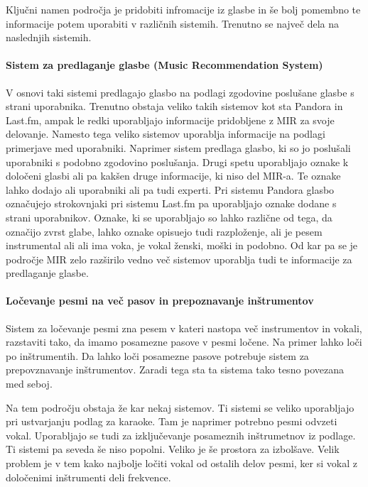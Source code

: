 \documentclass[a4paper, 12pt]{book}
\begin{document}
{Ključni namen področja je pridobiti infromacije iz glasbe in še bolj pomembno te informacije potem uporabiti v različnih sistemih. Trenutno se največ dela na naslednjih sistemih. 

\paragraph{Sistem za predlaganje glasbe (Music Recommendation System)}

V osnovi taki sistemi predlagajo glasbo na podlagi zgodovine poslušane glasbe s strani uporabnika. Trenutno obstaja veliko takih sistemov kot sta Pandora in Last.fm, ampak le redki uporabljajo informacije pridobljene z MIR za svoje delovanje. Namesto tega veliko sistemov uporablja informacije na podlagi primerjave med uporabniki. Naprimer sistem predlaga glasbo, ki so jo poslušali uporabniki s podobno zgodovino poslušanja. Drugi spetu uporabljajo oznake k določeni glasbi ali pa kakšen druge informacije, ki niso del MIR-a. Te oznake lahko dodajo ali uporabniki ali pa tudi experti. Pri sistemu Pandora glasbo označujejo strokovnjaki pri sistemu Last.fm pa uporabljajo oznake dodane s strani uporabnikov. Oznake, ki se uporabljajo so lahko različne od tega, da označijo zvrst glabe, lahko oznake opisuejo tudi razploženje, ali je pesem instrumental ali ali ima voka, je vokal ženski, moški in podobno. Od kar pa se je področje MIR zelo razširilo vedno več sistemov uporablja tudi te informacije za predlaganje glasbe. 
 
\paragraph{Ločevanje pesmi na več pasov in prepoznavanje inštrumentov}

Sistem za ločevanje pesmi zna pesem v kateri nastopa več instrumentov in vokali, razstaviti tako, da imamo posamezne pasove v pesmi ločene. Na primer lahko loči po inštrumentih. Da lahko loči posamezne pasove potrebuje sistem za prepovznavanje inštrumentov. Zaradi tega sta ta sistema tako tesno povezana med seboj. 

Na tem področju obstaja že kar nekaj sistemov. Ti sistemi se veliko uporabljajo pri ustvarjanju podlag za karaoke. Tam je naprimer potrebno pesmi odvzeti vokal. Uporabljajo se tudi za izključevanje posameznih inštrumetnov iz podlage. Ti sistemi pa seveda še niso popolni. Veliko je še prostora za izbolšave. Velik problem je v tem kako najbolje ločiti vokal od ostalih delov pesmi, ker si vokal z določenimi inštrumenti deli frekvence.

}
\end{document}
